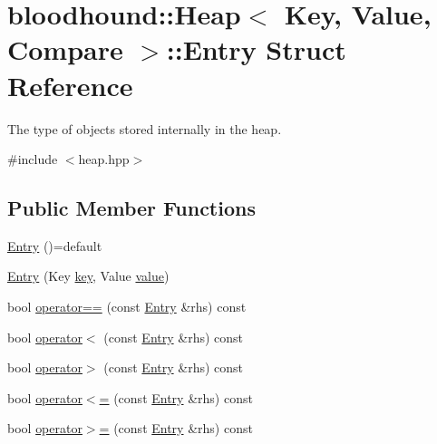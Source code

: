 \hypertarget{structbloodhound_1_1Heap_1_1Entry}{}\section{bloodhound\+:\+:Heap$<$ Key, Value, Compare $>$\+:\+:Entry Struct Reference}
\label{structbloodhound_1_1Heap_1_1Entry}


The type of objects stored internally in the heap.  




{\ttfamily \#include $<$heap.\+hpp$>$}

\subsection*{Public Member Functions}
\begin{DoxyCompactItemize}
\item 
\hyperlink{structbloodhound_1_1Heap_1_1Entry_ad445248902c7d7f3e79bf58acf24e58b}{Entry} ()=default
\item 
\hyperlink{structbloodhound_1_1Heap_1_1Entry_a66cc03955b70ebbadf7536f6ebf963f2}{Entry} (Key \hyperlink{structbloodhound_1_1Heap_1_1Entry_abc30d59b3c7bd01c36df918c8a2dd597}{key}, Value \hyperlink{structbloodhound_1_1Heap_1_1Entry_a4f777f54235490b4eb2f0f3af22b9c8b}{value})
\item 
bool \hyperlink{structbloodhound_1_1Heap_1_1Entry_a83880fd9d00a65e577e75f6dacee0322}{operator==} (const \hyperlink{structbloodhound_1_1Heap_1_1Entry}{Entry} \&rhs) const
\item 
bool \hyperlink{structbloodhound_1_1Heap_1_1Entry_a17049d7313c3c1cd51f9c684ddb50500}{operator$<$} (const \hyperlink{structbloodhound_1_1Heap_1_1Entry}{Entry} \&rhs) const
\item 
bool \hyperlink{structbloodhound_1_1Heap_1_1Entry_a5425815681ee88c97babbee6e9b8c0eb}{operator$>$} (const \hyperlink{structbloodhound_1_1Heap_1_1Entry}{Entry} \&rhs) const
\item 
bool \hyperlink{structbloodhound_1_1Heap_1_1Entry_a334618ef77d48b67a148d2f7414416e2}{operator$<$=} (const \hyperlink{structbloodhound_1_1Heap_1_1Entry}{Entry} \&rhs) const
\item 
bool \hyperlink{structbloodhound_1_1Heap_1_1Entry_ae6c13b04614fc5bc287577d83a524831}{operator$>$=} (const \hyperlink{structbloodhound_1_1Heap_1_1Entry}{Entry} \&rhs) const
\end{DoxyCompactItemize}
